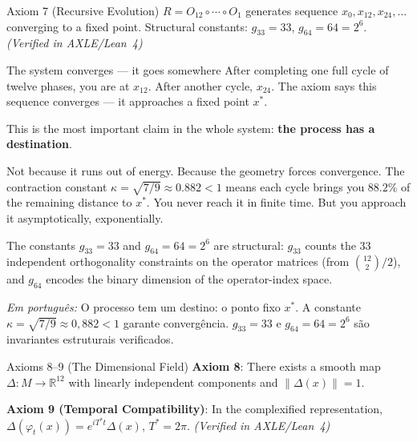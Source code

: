\documentclass[12pt, openright]{book}
\theoremstyle{definition}
\theoremstyle{remark}
\begin{document}
\begin{formalbox}{Axiom 7 (Recursive Evolution)}
$R = O_{12} \circ \cdots \circ O_1$ generates sequence
$x_0, x_{12}, x_{24}, \ldots$ converging to a fixed point.
Structural constants: $g_{33} = 33$, $g_{64} = 64 = 2^6$.
\hfill\textit{(Verified in AXLE/Lean~4)}
\end{formalbox}

\begin{studentbox}{The system converges --- it goes somewhere}
After completing one full cycle of twelve phases, you are at $x_{12}$.
After another cycle, $x_{24}$. The axiom says this sequence
converges --- it approaches a fixed point $x^*$.

This is the most important claim in the whole system:
\textbf{the process has a destination}.

Not because it runs out of energy. Because the geometry
forces convergence. The contraction constant
$\kappa = \sqrt{7/9} \approx 0.882 < 1$ means each cycle
brings you $88.2\%$ of the remaining distance to $x^*$.
You never reach it in finite time. But you approach it
asymptotically, exponentially.

The constants $g_{33} = 33$ and $g_{64} = 64 = 2^6$ are
structural: $g_{33}$ counts the 33 independent orthogonality
constraints on the operator matrices (from $\binom{12}{2}/2$),
and $g_{64}$ encodes the binary dimension of the operator-index space.

\textit{Em português:}
O processo tem um destino: o ponto fixo $x^*$.
A constante $\kappa = \sqrt{7/9} \approx 0{,}882 < 1$ garante convergência.
$g_{33} = 33$ e $g_{64} = 64 = 2^6$ são invariantes estruturais verificados.
\end{studentbox}

\begin{formalbox}{Axioms 8--9 (The Dimensional Field)}
\textbf{Axiom 8}: There exists a smooth map $\Delta : M \to \mathbb{R}^{12}$
with linearly independent components and $\|\Delta(x)\| = 1$.

\textbf{Axiom 9 (Temporal Compatibility)}: In the complexified
representation, $\Delta(\varphi_t(x)) = e^{iT^*t} \Delta(x)$, $T^* = 2\pi$.
\hfill\textit{(Verified in AXLE/Lean~4)}
\end{formalbox}
\end{document}
